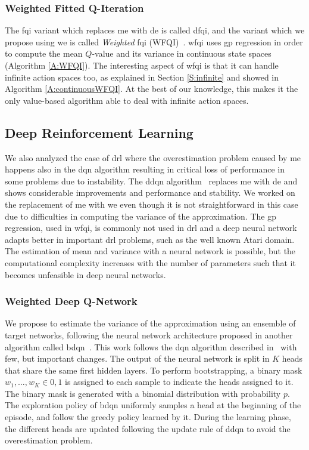 \subsubsection{Weighted Fitted Q-Iteration}
The \gls{fqi} variant which replaces \gls{me} with \gls{de} is called \gls{dfqi}, and the variant which we propose using \gls{we} is called \textit{Weighted} \gls{fqi} (WFQI)~\cite{deramo2017maximum}. \gls{wfqi} uses \gls{gp} regression in order to compute the mean $Q$-value and its variance in continuous state spaces (Algorithm \ref{A:WFQI}). The interesting aspect of \gls{wfqi} is that it can handle infinite action spaces too, as explained in Section \ref{S:infinite} and showed in Algorithm \ref{A:continuousWFQI}. At the best of our knowledge, this makes it the only value-based algorithm able to deal with infinite action spaces.

\subsection{Deep Reinforcement Learning}
We also analyzed the case of \gls{drl} where the overestimation problem caused by \gls{me} happens also in the \gls{dqn} algorithm resulting in critical loss of performance in some problems due to instability. The \gls{ddqn} algorithm~\cite{hasselt2015double} replaces \gls{me} with \gls{de} and shows considerable improvements and performance and stability. We worked on the replacement of \gls{me} with \gls{we} even though it is not straightforward in this case due to difficulties in computing the variance of the approximation. The \gls{gp} regression, used in \gls{wfqi}, is commonly not used in \gls{drl} and a deep neural network adapts better in important \gls{drl} problems, such as the well known Atari domain. The estimation of mean and variance with a neural network is possible, but the computational complexity increases with the number of parameters such that it becomes unfeasible in deep neural networks.

\subsubsection{Weighted Deep Q-Network}
We propose to estimate the variance of the approximation using an ensemble of target networks, following the neural network architecture proposed in another algorithm called \gls{bdqn}~\cite{osband2017deep}. This work follows the \gls{dqn} algorithm described in~\cite{mnih2015human} with few, but important changes. The output of the neural network is split in $K$ heads that share the same first hidden layers. To perform bootstrapping, a binary mask $w_1, \dots, w_K \in {0,1}$ is assigned to each sample to indicate the heads assigned to it. The binary mask is generated with a binomial distribution with probability $p$. The exploration policy of \gls{bdqn} uniformly samples a head at the beginning of the episode, and follow the greedy policy learned by it. During the learning phase, the different heads are updated following the update rule of \gls{ddqn} to avoid the overestimation problem.

